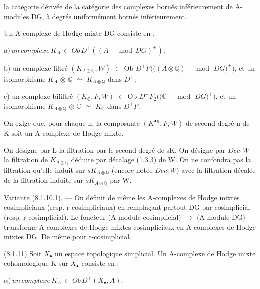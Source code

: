 \documentclass[11pt,twoside]{article}
\newcommand{\DFormula}[1]{%
  \par\smallskip\noindent\hspace*{0pt}\(\displaystyle #1\)\par\smallskip
}
\begin{document}
la catégorie dérivée de la catégorie des complexes bornés inférieurement de A-modules DG, à degrés uniformément bornés inférieurement.\par
\par\medskip
Un A-complexe de Hodge mixte DG consiste en :\par
\par\medskip
\DFormula{a)\,un\,complexe\,K_{A}\,\in \,Ob\,D^{+}((A-\operatorname{mod}\,DG)^{+});}
\par\medskip
b) un complexe filtré \((K_{A\otimes \mathbb{Q}},W)\) \(\in \) Ob \(D^{+}F(((A\otimes \mathbb{Q})-\operatorname{mod}\) \(DG)^{+})\), et un isomorphisme \(K_{A}\) \(\otimes \) \(\mathbb{Q}\) \(\simeq \) \(K_{A\otimes \mathbb{Q}}\) dans \(D^{+}\);\par
\par\medskip
c) un complexe bifiltré \((K_{\mathbb{C}},F,W)\) \(\in \) Ob \(D^{+}F_{2}((\mathbb{C}-\operatorname{mod}\) \(DG)^{+})\), et un isomorphisme \(K_{A\otimes \mathbb{Q}}\) \(\otimes \) \(\mathbb{C}\) \(\simeq \) \(K_{\mathbb{C}}\) dans \(D^{+}F\).\par
\par\medskip
On exige que, pour chaque n, la composante \((K^{\bullet n},F,W)\) de second degré n de K soit un A-complexe de Hodge mixte.\par
\par\medskip
On désigne par L la filtration par le second degré de sK. On désigne par \(Dec_{1}W\) la filtration de \(K_{A\otimes \mathbb{Q}}\) déduite par décalage (1.3.3) de W. On ne confondra pas la filtration qu’elle induit sur \(sK_{A\otimes \mathbb{Q}}\) (encore notée \(Dec_{1}W)\) avec la filtration décalée de la filtration induite sur \(sK_{A\otimes \mathbb{Q}}\) par W.\par
\par\medskip
Variante (8.1.10.1). — On définit de même les A-complexes de Hodge mixtes cosimpliciaux (resp. r-cosimpliciaux) en remplaçant partout DG par cosimplicial (resp. r-cosimplicial). Le foncteur (A-module cosimplicial) \(\to \) (A-module DG) transforme A-complexes de Hodge mixtes cosimpliciaux en A-complexes de Hodge mixtes DG. De même pour r-cosimplicial.\par
\par\medskip
(8.1.11) Soit \(X_{\bullet }\) un espace topologique simplicial. Un A-complexe de Hodge mixte cohomologique K sur \(X_{\bullet }\) consiste en :\par
\par\medskip
\DFormula{\alpha )\,un\,complexe\,K_{A}\,\in \,Ob\,D^{+}(X_{\bullet },A);}
\end{document}
